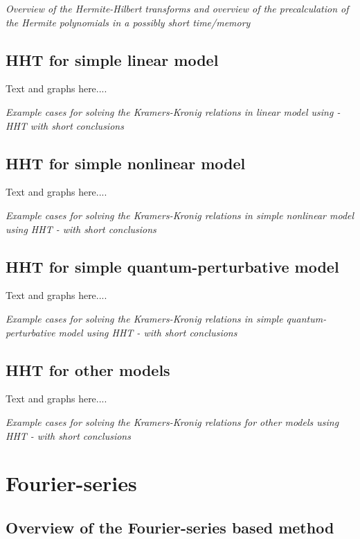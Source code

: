\documentclass[12pt,twoside,a4paper]{article}
\numberwithin{equation}{subsection}
\numberwithin{figure}{subsection}
\begin{document}
\textit{Overview of the Hermite-Hilbert transforms and overview of the precalculation of the Hermite polynomials in a possibly short
time/memory}

\subsection{HHT for simple linear model} \label{chap:hermite_lin}

Text and graphs here.... 

\textit{Example cases for solving the Kramers-Kronig relations in linear model using  - HHT with short conclusions}

\subsection{HHT for simple nonlinear model} \label{chap:hermite_nlo}

Text and graphs here....

\textit{Example cases for solving the Kramers-Kronig relations in simple nonlinear model using HHT - with short conclusions}

\subsection{HHT for simple quantum-perturbative model} \label{chap:hermite_quantum}

Text and graphs here.... 

\textit{Example cases for solving the Kramers-Kronig relations in simple quantum-perturbative model using HHT - with short
conclusions}

\subsection{HHT for other models} \label{chap:hermite_other}

Text and graphs here.... 

\textit{Example cases for solving the Kramers-Kronig relations for other models using HHT - with short conclusions}

\section{Fourier-series} \label{chap:fourier}

\subsection{Overview of the Fourier-series based method}  \label{chap:fourier_overview}
\end{document}
